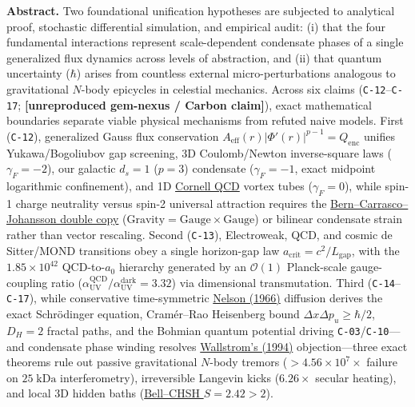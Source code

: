 \documentclass[11pt,letterpaper]{article}
\newcommand{\unrepro}{\textbf{\textcolor{red!60!black}{[unreproduced gem-nexus / Carbon claim]}}}
\begin{document}
\vspace{2pt}
\noindent\colorbox{softbg}{%
  \parbox{\dimexpr\linewidth-2\fboxsep\relax}{%
    \vspace{4pt}
    \textbf{\color{primary}Abstract.} Two foundational unification hypotheses are subjected to analytical proof, stochastic differential simulation, and empirical audit: (i) that the four fundamental interactions represent scale-dependent condensate phases of a single generalized flux dynamics across levels of abstraction, and (ii) that quantum uncertainty ($\hbar$) arises from countless external micro-perturbations analogous to gravitational $N$-body epicycles in celestial mechanics. Across six claims (\texttt{C-12}--\texttt{C-17}; \unrepro), exact mathematical boundaries separate viable physical mechanisms from refuted naive models. First (\texttt{C-12}), generalized Gauss flux conservation $A_{\mathrm{eff}}(r)|\Phi'(r)|^{p-1} = Q_{\mathrm{enc}}$ unifies Yukawa/Bogoliubov gap screening, 3D Coulomb/Newton inverse-square laws ($\gamma_F = -2$), our galactic $d_s = 1$ ($p=3$) condensate ($\gamma_F = -1$, exact midpoint logarithmic confinement), and 1D \href{https://arxiv.org/pdf/hep-ph/0001312}{Cornell QCD} vortex tubes ($\gamma_F = 0$), while spin-1 charge neutrality versus spin-2 universal attraction requires the \href{https://link.aps.org/doi/10.1103/PhysRevLett.105.061602}{Bern--Carrasco--Johansson double copy} ($\text{Gravity} = \text{Gauge} \times \text{Gauge}$) or bilinear condensate strain rather than vector rescaling. Second (\texttt{C-13}), Electroweak, QCD, and cosmic de Sitter/MOND transitions obey a single horizon-gap law $a_{\mathrm{crit}} = c^2 / L_{\mathrm{gap}}$, with the $1.85\times 10^{42}$ QCD-to-$a_0$ hierarchy generated by an $\mathcal{O}(1)$ Planck-scale gauge-coupling ratio ($\alpha_{\mathrm{UV}}^{\mathrm{QCD}}/\alpha_{\mathrm{UV}}^{\mathrm{dark}} = 3.32$) via dimensional transmutation. Third (\texttt{C-14}--\texttt{C-17}), while conservative time-symmetric \href{https://link.aps.org/doi/10.1103/PhysRev.150.1079}{Nelson (1966)} diffusion derives the exact Schr\"odinger equation, Cram\'er--Rao Heisenberg bound $\Delta x\Delta p_u \ge \hbar/2$, $D_H = 2$ fractal paths, and the Bohmian quantum potential driving \texttt{C-03}/\texttt{C-10}---and condensate phase winding resolves \href{https://link.aps.org/doi/10.1103/PhysRevA.49.1613}{Wallstrom's (1994)} objection---three exact theorems rule out passive gravitational $N$-body tremors ($>4.56\times 10^7\times$ failure on $25\;\mathrm{kDa}$ interferometry), irreversible Langevin kicks ($6.26\times$ secular heating), and local 3D hidden baths (\href{https://pubmed.ncbi.nlm.nih.gov/26503041/}{Bell--CHSH $S = 2.42 > 2$}).
    \vspace{4pt}
  }%
}
\end{document}
